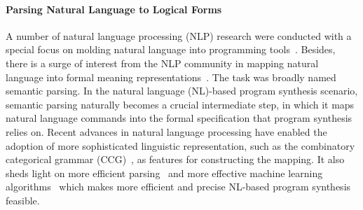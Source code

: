 \paragraph{Parsing Natural Language to Logical Forms} A number of natural language processing (NLP) research were conducted with a special focus on molding natural language into programming tools~\cite{mihalcea2006nlp,LandhauBer:2015:TUP:2820668.2820671}. Besides, 
there is a surge of interest from the NLP community in mapping natural language into formal meaning representations~\cite{Zettlemoyer05learningto,artzi2013weakly,DBLP:Poon13,Kwiatkowski:2011:LGC:2145432.2145593,liang2013learning}. The task was broadly named semantic parsing. In the natural language (NL)-based program synthesis scenario, semantic parsing naturally becomes a crucial intermediate step, in which it maps natural language commands into the formal specification that program synthesis relies on.  Recent advances in natural language processing have enabled the adoption of more sophisticated linguistic representation, such as the combinatory categorical grammar (CCG)~\cite{opac-b1080082}, as features for constructing the mapping. It also sheds light on more efficient parsing~\cite{lewis2015joint} and more effective machine learning algorithms~\cite{DBLP:journals/corr/ZarembaS14} which makes more efficient and precise NL-based program synthesis feasible.
